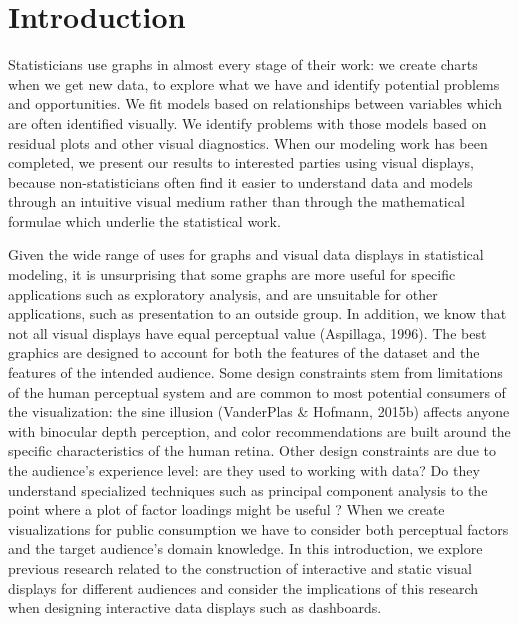 \documentclass[print]{nuthesis}
\begin{document}
\hypertarget{introduction}{%
\chapter{Introduction}\label{introduction}}

Statisticians use graphs in almost every stage of their work: we create charts when we get new data, to explore what we have and identify potential problems and opportunities.
We fit models based on relationships between variables which are often identified visually.
We identify problems with those models based on residual plots and other visual diagnostics.
When our modeling work has been completed, we present our results to interested parties using visual displays, because non-statisticians often find it easier to understand data and models through an intuitive visual medium rather than through the mathematical formulae which underlie the statistical work.

Given the wide range of uses for graphs and visual data displays in statistical modeling, it is unsurprising that some graphs are more useful for specific applications such as exploratory analysis, and are unsuitable for other applications, such as presentation to an outside group.
In addition, we know that not all visual displays have equal perceptual value (Aspillaga, 1996).
The best graphics are designed to account for both the features of the dataset and the features of the intended audience.
Some design constraints stem from limitations of the human perceptual system and are common to most potential consumers of the visualization: the sine illusion (VanderPlas \& Hofmann, 2015b) affects anyone with binocular depth perception, and color recommendations are built around the specific characteristics of the human retina.
Other design constraints are due to the audience's experience level: are they used to working with data?
Do they understand specialized techniques such as principal component analysis to the point where a plot of factor loadings might be  useful ?
When we create visualizations for public consumption we have to consider both perceptual factors and the target audience's domain knowledge.
In this introduction, we explore previous research related to the construction of interactive and static visual displays for different audiences and consider the implications of this research when designing interactive data displays such as dashboards.

\end{document}
